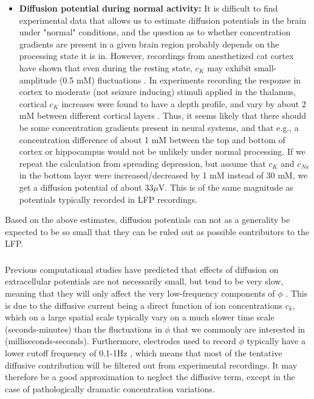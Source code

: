 \begin{itemize}
\item{\bf Diffusion potential during normal activity:} It is difficult to find experimental data that allows us to estimate diffusion potentials in the brain under "normal" conditions, and the question as to whether concentration gradients are present in a given brain region probably depends on the processing state it is in. However, recordings from anesthetized cat cortex have shown that even during the resting state, $c_K$ may exhibit small-amplitude (0.5 mM) fluctuations \cite{MCCREERY1983}. In experiments recording the response in cortex to moderate (not seizure inducing) stimuli applied in the thalamus, cortical $c_K$ increases were found to have a depth profile, and vary by about 2 mM between different cortical layers \cite{Cordingley1978}. Thus, it seems likely that there should be some concentration gradients present in neural systems, and that e.g., a concentration difference of about 1 mM between the top and bottom of cortex or hippocampus would not be unlikely under normal processing. If we repeat the calculation from spreading depression, but assume that $c_{K}$ and $c_{Na}$ in the bottom layer were increased/decreased by 1 mM instead of 30 mM, we get a diffusion potential of about $33 \mu$V. This is of the same magnitude as potentials typically recorded in LFP recordings. 

\end{itemize}

Based on the above estimates, diffusion potentials can not as a generality be expected to be so small that they can be ruled out as possible contributors to the LFP. 


\subsubsection{}

Previous computational studies have predicted that effects of diffusion on extracellular potentials are not necessarily small, but tend to be very slow, meaning that they will only affect the very low-frequency components of $\phi$ \citep{Halnes2016, Halnes2017}. This is due to the diffusive current being a direct function of ion concentrations $c_k$, which on a large spatial scale typically vary on a much slower time scale (seconds-minutes) than the fluctuations in $\phi$ that we commonly are interested in (milliseconds-seconds). Furthermore, electrodes used to record $\phi$ typically have a lower cutoff frequency of 0.1-1Hz \citep{Einevoll2013}, which means that most of the tentative diffusive contribution will be filtered out from experimental recordings. It may therefore be a good approximation to neglect the diffusive term, except in the case of pathologically dramatic concentration variations.
